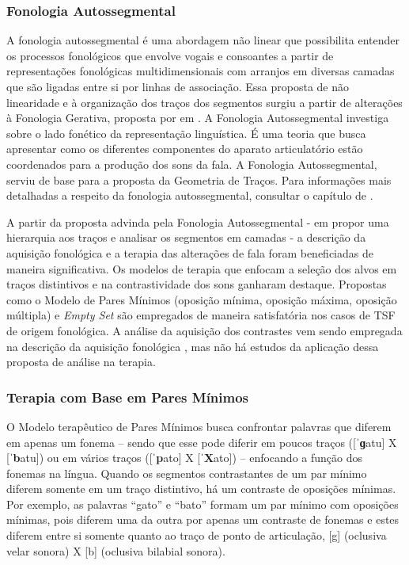 \documentclass[output=paper,colorlinks,citecolor=brown,booklanguage=portuguese]{langscibook}
\begin{document}
\subsubsection{Fonologia Autossegmental}\label{sec:cap5sec2doisum}
A fonologia autossegmental é uma abordagem não linear que possibilita entender os processos fonológicos que envolve vogais e consoantes a partir de representações fonológicas multidimensionais com arranjos em diversas camadas que são ligadas entre si por linhas de associação. Essa proposta de não linearidade e à organização dos traços dos segmentos surgiu a partir de alterações à Fonologia Gerativa, proposta por \citeauthor{Chomsky1968} em \citeyear{Chomsky1968} \citep{Chomsky1968}. A Fonologia Autossegmental investiga sobre o lado fonético da representação linguística. É uma teoria que busca apresentar como os diferentes componentes do aparato articulatório estão coordenados para a produção dos sons da fala. A Fonologia Autossegmental, serviu de base para a proposta da Geometria de Traços. Para informações mais detalhadas a respeito da fonologia autossegmental, consultar o capítulo de .

A partir da proposta advinda pela Fonologia Autossegmental - em propor uma hierarquia aos traços e analisar os segmentos em camadas - a descrição da aquisição fonológica e a terapia das alterações de fala foram beneficiadas de maneira significativa. Os modelos de terapia que enfocam a seleção dos alvos em traços distintivos e na contrastividade dos sons ganharam destaque. Propostas como o Modelo de Pares Mínimos (oposição mínima, oposição máxima, oposição múltipla) e \emph{Empty Set} são empregados de maneira satisfatória nos casos de TSF de origem fonológica. A análise da aquisição dos contrastes vem sendo empregada na descrição da aquisição fonológica \citep{LazzarottoVolcao2009}, mas não há estudos da aplicação dessa proposta de análise na terapia.

\subsubsection{Terapia com Base em Pares Mínimos}\label{sec:cap5sec2doisdois}

O Modelo terapêutico de Pares Mínimos busca confrontar palavras que diferem em apenas um fonema -- sendo que esse pode diferir em poucos traços ([ˈ\textbf{ɡ}atu] X [ˈ\textbf{b}atu]) ou em vários traços ([ˈ\textbf{p}ato] X [ˈ\textbf{X}ato]) -- enfocando a função dos fonemas na língua. Quando os segmentos contrastantes de um par mínimo diferem somente em um traço distintivo, há um contraste de oposições mínimas. Por exemplo, as palavras “gato” e “bato” formam um par mínimo com oposições mínimas, pois diferem uma da outra por apenas um contraste de fonemas e estes diferem entre si somente quanto ao traço de ponto de articulação, [g] (oclusiva velar sonora) X [b] (oclusiva bilabial sonora).
\end{document}
